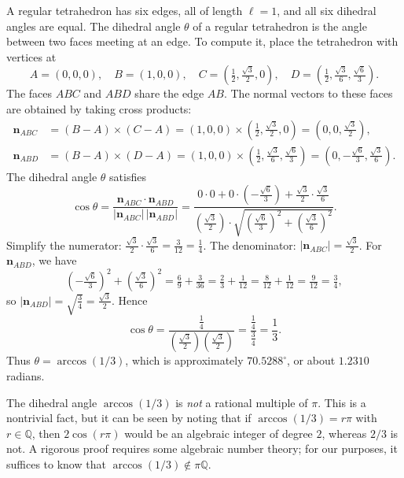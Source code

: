 A regular tetrahedron has six edges, all of length $\ell = 1$, and all six dihedral angles are equal. The dihedral angle $\theta$ of a regular tetrahedron is the angle between two faces meeting at an edge. To compute it, place the tetrahedron with vertices at
\[
A = (0,0,0), \quad B = (1,0,0), \quad C = \left(\tfrac12, \tfrac{\sqrt3}{2}, 0\right), \quad D = \left(\tfrac12, \tfrac{\sqrt3}{6}, \tfrac{\sqrt6}{3}\right).
\]
The faces $ABC$ and $ABD$ share the edge $AB$. The normal vectors to these faces are obtained by taking cross products:
\begin{align*}
\mathbf{n}_{ABC} &= (B-A) \times (C-A) = (1,0,0) \times \left(\tfrac12, \tfrac{\sqrt3}{2}, 0\right) = \left(0,0,\tfrac{\sqrt3}{2}\right),\\
\mathbf{n}_{ABD} &= (B-A) \times (D-A) = (1,0,0) \times \left(\tfrac12, \tfrac{\sqrt3}{6}, \tfrac{\sqrt6}{3}\right) = \left(0,-\tfrac{\sqrt6}{3}, \tfrac{\sqrt3}{6}\right).
\end{align*}
The dihedral angle $\theta$ satisfies
\[
\cos\theta = \frac{\mathbf{n}_{ABC} \cdot \mathbf{n}_{ABD}}
{|\mathbf{n}_{ABC}|\,|\mathbf{n}_{ABD}|}
= \frac{0\cdot0 + 0\cdot\left(-\tfrac{\sqrt6}{3}\right) + \tfrac{\sqrt3}{2} \cdot \tfrac{\sqrt3}{6}}
{\left(\tfrac{\sqrt3}{2}\right) \cdot \sqrt{\left(\tfrac{\sqrt6}{3}\right)^2 + \left(\tfrac{\sqrt3}{6}\right)^2}}.
\]
Simplify the numerator: $\tfrac{\sqrt3}{2} \cdot \tfrac{\sqrt3}{6} = \tfrac{3}{12} = \tfrac14$. The denominator: $|\mathbf{n}_{ABC}| = \tfrac{\sqrt3}{2}$. For $\mathbf{n}_{ABD}$, we have
\[
\left(-\tfrac{\sqrt6}{3}\right)^2 + \left(\tfrac{\sqrt3}{6}\right)^2 = \tfrac{6}{9} + \tfrac{3}{36} = \tfrac{2}{3} + \tfrac{1}{12} = \tfrac{8}{12} + \tfrac{1}{12} = \tfrac{9}{12} = \tfrac34,
\]
so $|\mathbf{n}_{ABD}| = \sqrt{\tfrac34} = \tfrac{\sqrt3}{2}$. Hence
\[
\cos\theta = \frac{\tfrac14}{\left(\tfrac{\sqrt3}{2}\right)\left(\tfrac{\sqrt3}{2}\right)} = \frac{\tfrac14}{\tfrac34} = \frac13.
\]
Thus $\theta = \arccos(1/3)$, which is approximately $70.5288^\circ$, or about $1.2310$ radians.

\begin{remark}
The dihedral angle $\arccos(1/3)$ is \emph{not} a rational multiple of $\pi$. This is a nontrivial fact, but it can be seen by noting that if $\arccos(1/3) = r\pi$ with $r \in \mathbb{Q}$, then $2\cos(r\pi)$ would be an algebraic integer of degree $2$, whereas $2/3$ is not. A rigorous proof requires some algebraic number theory; for our purposes, it suffices to know that $\arccos(1/3) \notin \pi\mathbb{Q}$.
\end{remark}

